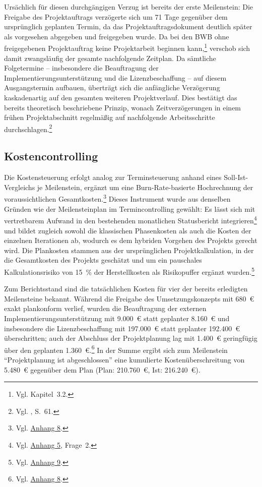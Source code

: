 \documentclass[
    12pt, 
    a4paper,
    ]{scrartcl} %
\begin{document}
Ursächlich für diesen durchgängigen Verzug ist bereits der erste Meilenstein: Die Freigabe des Projektauftrags verzögerte sich um 71 Tage gegenüber dem ursprünglich geplanten Termin, da das Projektauftragsdokument deutlich später als vorgesehen abgegeben und freigegeben wurde. Da bei den BWB ohne freigegebenen Projektauftrag keine Projektarbeit beginnen kann,\footnote{Vgl. Kapitel~3.2.} verschob sich damit zwangsläufig der gesamte nachfolgende Zeitplan. Da sämtliche Folgetermine -- insbesondere die Beauftragung der Implementierungsunterstützung und die Lizenzbeschaffung -- auf diesem Ausgangstermin aufbauen, überträgt sich die anfängliche Verzögerung kaskadenartig auf den gesamten weiteren Projektverlauf. Dies bestätigt das bereits theoretisch beschriebene Prinzip, wonach Zeitverzögerungen in einem frühen Projektabschnitt regelmäßig auf nachfolgende Arbeitsschritte durchschlagen.\footnote{Vgl. \cite{Nobach_Projektcontrolling}, S.~61.}

\subsection{Kostencontrolling}

Die Kostensteuerung erfolgt analog zur Terminsteuerung anhand eines Soll-Ist-Vergleichs je Meilenstein, ergänzt um eine Burn-Rate-basierte Hochrechnung der voraussichtlichen Gesamtkosten.\footnote{Vgl. \hyperref[sec:Anhang8]{Anhang 8}.} Dieses Instrument wurde aus denselben Gründen wie der Meilensteinplan im Termincontrolling gewählt: Es lässt sich mit vertretbarem Aufwand in den bestehenden monatlichen Statusbericht integrieren\footnote{Vgl. \hyperref[sec:Anhang5]{Anhang 5}, Frage~2.} und bildet zugleich sowohl die klassischen Phasenkosten als auch die Kosten der einzelnen Iterationen ab, wodurch es dem hybriden Vorgehen des Projekts gerecht wird. Die Plankosten stammen aus der ursprünglichen Projektkalkulation, in der die Gesamtkosten des Projekts geschätzt und um ein pauschales Kalkulationsrisiko von 15~\% der Herstellkosten als Risikopuffer ergänzt wurden.\footnote{Vgl. \hyperref[sec:Anhang9]{Anhang 9}.}

Zum Berichtsstand sind die tatsächlichen Kosten für vier der bereits erledigten Meilensteine bekannt. Während die Freigabe des Umsetzungskonzepts mit 680~€ exakt plankonform verlief, wurden die Beauftragung der externen Implementierungsunterstützung mit 9.000~€ statt geplanter 8.160~€ und insbesondere die Lizenzbeschaffung mit 197.000~€ statt geplanter 192.400~€ überschritten; auch der Abschluss der Projektplanung lag mit 1.400~€ geringfügig über den geplanten 1.360~€.\footnote{Vgl. \hyperref[sec:Anhang8]{Anhang 8}.} In der Summe ergibt sich zum Meilenstein ``Projektplanung ist abgeschlossen'' eine kumulierte Kostenüberschreitung von 5.480~€ gegenüber dem Plan (Plan: 210.760~€, Ist: 216.240~€).
\end{document}
